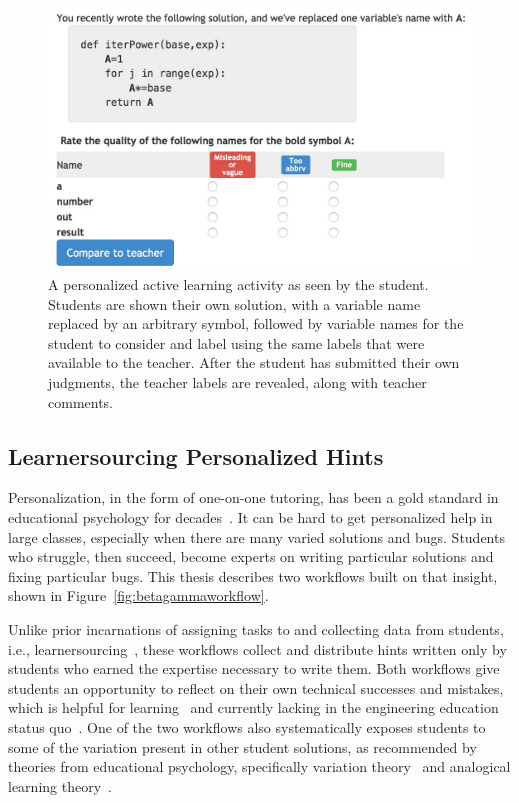 \begin{figure}
\centering
\includegraphics[width=0.8\linewidth]{Body/figures/foobaz/foobaz_personalized_quiz.jpg}
\caption{A personalized active learning activity as seen by the student. Students are shown their own solution, with a variable name replaced by an arbitrary symbol, followed by variable names for the student to consider and label using the same labels that were available to the teacher. After the student has submitted their own judgments, the teacher labels are revealed, along with teacher comments.}
\label{fig:foobaz_studentview}
\end{figure}


\subsection{Learnersourcing Personalized Hints}

Personalization, in the form of one-on-one tutoring, has been a gold standard in educational psychology for decades~\cite{bloom}. It can be hard to get personalized help in large classes, especially when there are many varied solutions and bugs. Students who struggle, then succeed, become experts on writing particular solutions and fixing particular bugs. This thesis describes two workflows built on that insight, shown in Figure~\ref{fig:betagammaworkflow}. 

Unlike prior incarnations of assigning tasks to and collecting data from students, i.e., learnersourcing~\cite{kim2013learnersourcing}, these workflows collect and distribute hints written only by students who earned the expertise necessary to write them. Both workflows give students an opportunity to reflect on their own technical successes and mistakes, which is helpful for learning~\cite{dewey1933} and currently lacking in the engineering education status quo~\cite{asee}. One of the two workflows also systematically exposes students to some of the variation present in other student solutions, as recommended by theories from educational psychology, specifically variation theory~\cite{marton1997learning} and analogical learning theory~\cite{kurtz01learning,loewenstein2003analogical}.

